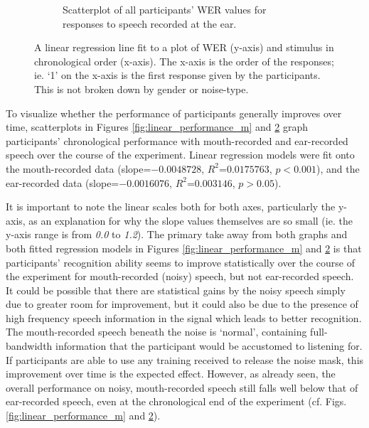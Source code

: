 \begin{figure}[ht]
\begin{subfigure}{0.47\textwidth}
\caption{Scatterplot of all participants' WER values for responses to speech recorded at the ear.}
\label{fig:linear_performance_e}
\end{subfigure}
\caption{A linear regression line fit to a plot of WER (y-axis) and stimulus in chronological order (x-axis).  The x-axis is the order of the responses; ie. `1' on the x-axis is the first response given by the participants.  This is not broken down by gender or noise-type.}
\end{figure}
%
To visualize whether the performance of participants generally improves over time, scatterplots in Figures \ref{fig:linear_performance_m} and \ref{fig:linear_performance_e} graph participants' chronological performance with mouth-recorded and ear-recorded speech over the course of the experiment.  Linear regression models were fit onto the mouth-recorded data (slope=$-0.0048728$, $R^2$=$0.0175763$, $p<0.001$), and the ear-recorded data (slope=$-0.0016076$, $R^2$=$0.003146$, $p>0.05$). 

It is important to note the linear scales both for both axes, particularly the y-axis, as an explanation for why the slope values themselves are so small (ie. the y-axis range is from \textit{0.0} to \textit{1.2}).  The primary take away from both graphs and both fitted regression models in Figures \ref{fig:linear_performance_m} and \ref{fig:linear_performance_e} is that participants' recognition ability seems to improve statistically over the course of the experiment for mouth-recorded (noisy) speech, but not ear-recorded speech.  It could be possible that there are statistical gains by the noisy speech simply due to greater room for improvement, but it could also be due to the presence of high frequency speech information in the signal which leads to better recognition. The mouth-recorded speech beneath the noise is `normal', containing full-bandwidth information that the participant would be accustomed to listening for.  If participants are able to use any training received to release the noise mask, this improvement over time is the expected effect.  However, as already seen, the overall performance on noisy, mouth-recorded speech still falls well below that of ear-recorded speech, even at the chronological end of the experiment (cf. Figs. \ref{fig:linear_performance_m} and \ref{fig:linear_performance_e}).

